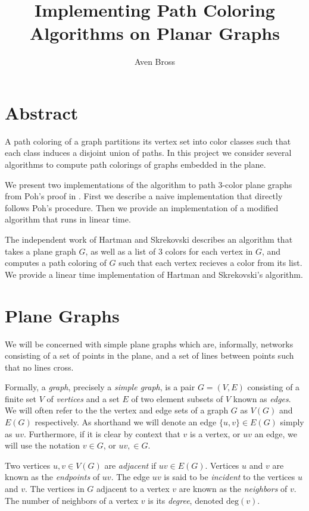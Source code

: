 \documentclass[letterpaper, 12pt]{article}
\title{Implementing Path Coloring Algorithms on Planar Graphs}
\author{Aven Bross}
\theoremstyle{definition}
\theoremstyle{definition}
\theoremstyle{thm}
\theoremstyle{definition}
\begin{document}
\maketitle

\section*{Abstract}
A path coloring of a graph partitions its vertex set into color classes such that
each class induces a disjoint union of paths. In this project we consider several
algorithms to compute path colorings of graphs embedded in the plane.

We present two implementations of the algorithm to path $3$-color plane graphs
from Poh's proof in \cite{poh}. First we describe a naive implementation that
directly follows Poh's procedure. Then we provide an implementation of a
modified algorithm that runs in linear time.

The independent work of Hartman \cite{hartman} and Skrekovski \cite{skrekovski}
describes an algorithm that takes a plane graph $G$, as well as a list of $3$
colors for each vertex in $G$, and computes a path coloring of $G$ such that
each vertex recieves a color from its list. We provide a linear time
implementation of Hartman and Skrekovski's algorithm.

\section{Plane Graphs}

We will be concerned with simple plane graphs which are, informally, networks
consisting of a set of points in the plane, and a set of lines between points
such that no lines cross.

Formally, a \textit{graph}, precisely a \textit{simple graph}, is a pair
$G=(V,E)$ consisting of a finite set $V$ of \textit{vertices} and a set $E$ of
two element subsets of $V$ known as \textit{edges}. We will often refer to the
the vertex and edge sets of a graph $G$ as $V(G)$ and $E(G)$ respectively. As
shorthand we will denote an edge $\{u,v\}\in E(G)$ simply as $uv$. Furthermore,
if it is clear by context that $v$ is a vertex, or $uv$ an edge, we will use the
notation $v\in G$, or $uv,\in G$.

Two vertices $u,v\in V(G)$ are \textit{adjacent} if $uv\in E(G)$. Vertices $u$
and $v$ are known as the \textit{endpoints} of $uv$. The edge $uv$ is said to be
\textit{incident} to the vertices $u$ and $v$. The vertices in $G$ adjacent to a vertex
$v$ are known as the \textit{neighbors} of $v$. The number of neighbors of a
vertex $v$ is its \textit{degree}, denoted $\text{deg}(v)$.
\end{document}
